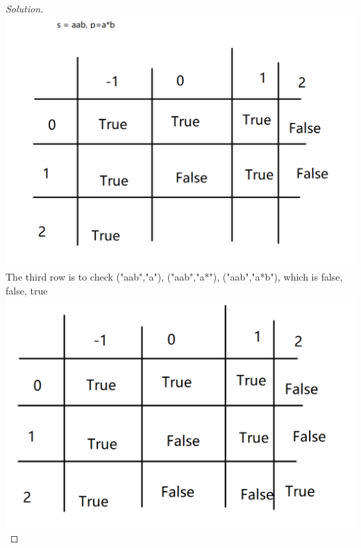 \documentclass[12pt]{article}
\begin{document}
\begin{proof}[Solution]
	\includegraphics[scale=0.3]{s2.png}\\
	The third row is to check ("aab","a"), ("aab","a*"), ("aab","a*b"), which is false, false, true\\
	\includegraphics[scale=0.3]{s3.png}\\
\end{proof}
\end{document}
